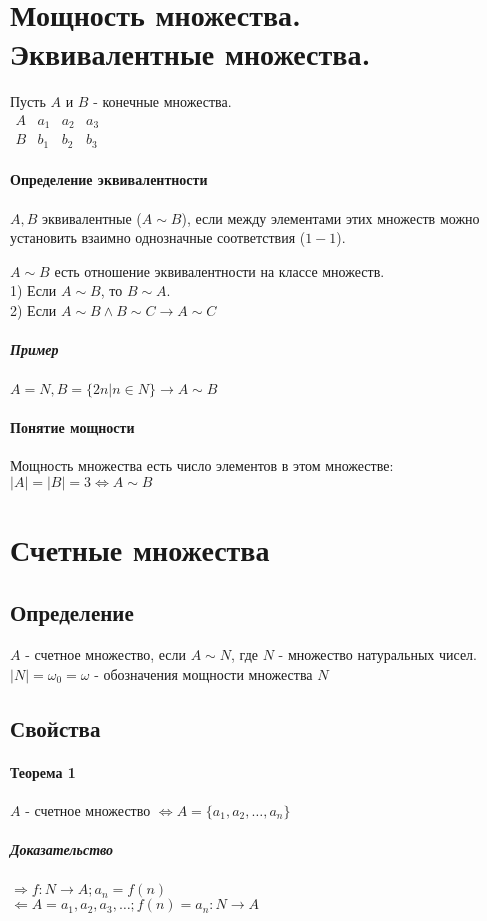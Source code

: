 \documentclass[10pt]{article}
\begin{document}
	\section{Мощность множества. Эквивалентные множества.}
		Пусть $A$ и $B$ - конечные множества.\\
	
		$\begin{array}{|c|c|c|c|}
		\hline
		A & a_1 & a_2 & a_3\\
		\hline
		B & b_1 & b_2 & b_3
		\end{array}$\\
		
		\paragraph{Определение эквивалентности} $A, B$ эквивалентные ($A\sim B$), если между элементами этих множеств можно установить
		взаимно однозначные соответствия ($1-1$).
		
		$A \sim B$ есть отношение эквивалентности на классе множеств.\\
		1) Если $A \sim B$, то $B \sim A$.\\
		2) Если $A \sim B \wedge B \sim C \to A \sim C$		
		\subparagraph{Пример}
		$A = N, B = \{2n | n \in N\} \rightarrow A \sim B$
		\paragraph{Понятие мощности}
		Мощность множества есть число элементов в этом множестве: $|A| = |B| = 3 \Leftrightarrow A \sim B$
	
	\section{Счетные множества}
		\subsection{Определение}
			$A$ - счетное множество, если $A \sim N$, где $N$ - множество натуральных чисел.\\
			$|N| = \omega_0 = \omega$ - обозначения мощности множества $N$
		\subsection{Свойства}
			\paragraph{Теорема 1} 	$A$ - счетное множество $\Leftrightarrow A = \{a_1, a_2, \dots, a_n \}$ 
			\subparagraph{Доказательство} $\Rightarrow f : N \to A; a_n = f(n)$\\$\Leftarrow A = {a_1, a_2, a_3, \dots}; f(n) = a_n : N \to A$
\end{document}
